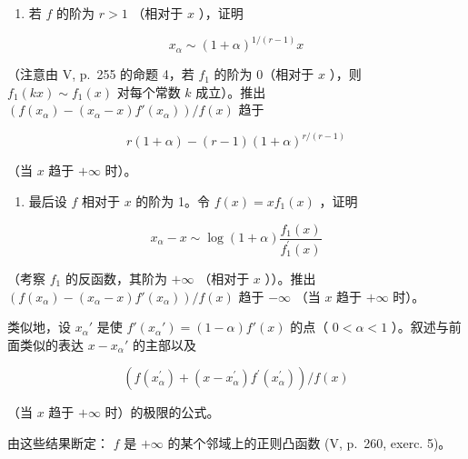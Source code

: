 \begin{enumerate}
\def\labelenumi{\alph{enumi})}
\setcounter{enumi}{1}
\tightlist
\item
  若 \(f\) 的阶为 \(r > 1\) （相对于 \(x\) ），证明
\end{enumerate}

\[
x _ {\alpha} \sim (1 + \alpha) ^ {1 / (r - 1)} x
\]

（注意由 V, p.~255 的命题 4，若 \(f_{1}\) 的阶为 0（相对于 \(x\) ），则 \(f_{1}(kx) \sim f_{1}(x)\) 对每个常数 \(k\) 成立）。推出 \(\left(f(x_{\alpha}) - (x_{\alpha} - x)f'(x_{\alpha})\right) / f(x)\) 趋于

\[
r (1 + \alpha) - (r - 1) (1 + \alpha) ^ {r / (r - 1)}
\]

（当 \(x\) 趋于 \(+\infty\) 时）。

\begin{enumerate}
\def\labelenumi{\alph{enumi})}
\setcounter{enumi}{2}
\tightlist
\item
  最后设 \(f\) 相对于 \(x\) 的阶为 1。令 \(f(x) = xf_1(x)\) ，证明
\end{enumerate}

\[
x _ {\alpha} - x \sim \log (1 + \alpha) \frac {f _ {1} (x)}{f _ {1} ^ {\prime} (x)}
\]

（考察 \(f_{1}\) 的反函数，其阶为 \(+\infty\) （相对于 \(x\) ））。推出 \(\left(f(x_{\alpha}) - (x_{\alpha} - x)f'(x_{\alpha})\right) / f(x)\) 趋于 \(-\infty\) （当 \(x\) 趋于 \(+\infty\) 时）。

类似地，设 \(x_{\alpha}'\) 是使 \(f'(x_{\alpha}') = (1 - \alpha)f'(x)\) 的点（ \(0 < \alpha < 1\) ）。叙述与前面类似的表达 \(x - x_{\alpha}'\) 的主部以及

\[
\left(f (x _ {\alpha} ^ {\prime}) + (x - x _ {\alpha} ^ {\prime}) f ^ {\prime} (x _ {\alpha} ^ {\prime})\right) / f (x)
\]

（当 \(x\) 趋于 \(+\infty\) 时）的极限的公式。

由这些结果断定： \(f\) 是 \(+\infty\) 的某个邻域上的正则凸函数 (V, p.~260, exerc. 5)。

\makeatletter
\gdef\@chapapp{\chaptername}
\makeatother
\renewcommand{\thechapter}{\chinese{chapter}}
\renewcommand{\thesection}{\S\arabic{section}}
\setcounter{chapter}{5}
